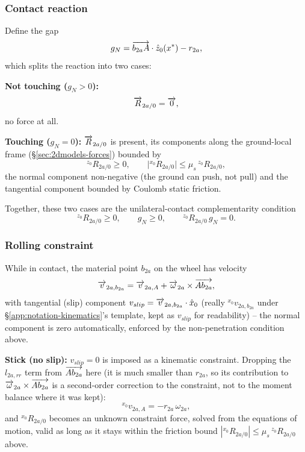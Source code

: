\subsubsection{Contact reaction}
Define the gap
\begin{equation}
    g_N = \overrightarrow{b_{2a}A}\cdot\hat z_0(x^*) - r_{2a},
\end{equation}
which splits the reaction into two cases:

\textbf{Not touching ($g_N>0$):}
\begin{equation}
    \overrightarrow{R}_{2a/0} = \overrightarrow{0},
\end{equation}
no force at all.

\textbf{Touching ($g_N=0$):} $\overrightarrow{R}_{2a/0}$ is present, its components along the ground-local frame (\S\ref{sec:2dmodels-forces}) bounded by
\begin{equation}
    {}^{z_0}R_{2a/0} \ge 0, \qquad \big|{}^{x_0}R_{2a/0}\big| \le \mu_s\,{}^{z_0}R_{2a/0},
\end{equation}
the normal component non-negative (the ground can push, not pull) and the tangential component bounded by Coulomb static friction.

Together, these two cases are the unilateral-contact complementarity condition
\begin{equation}
    {}^{z_0}R_{2a/0}\ge0, \qquad g_N\ge0, \qquad {}^{z_0}R_{2a/0}\,g_N=0.
\end{equation}

\subsubsection{Rolling constraint}
While in contact, the material point $b_{2a}$ on the wheel has velocity
\begin{equation}
    \overrightarrow{v}_{2a,b_{2a}} = \overrightarrow{v}_{2a,A} + \overrightarrow{\omega}_{2a}\times\overrightarrow{Ab_{2a}},
\end{equation}
with tangential (slip) component $v_{slip} = \overrightarrow{v}_{2a,b_{2a}}\cdot\hat x_0$ (really ${}^{x_0}v_{2a,b_{2a}}$ under \S\ref{app:notation-kinematics}'s template, kept as $v_{slip}$ for readability) -- the normal component is zero automatically, enforced by the non-penetration condition above.

\textbf{Stick (no slip):} $v_{slip}=0$ is imposed as a kinematic constraint. Dropping the $l_{2a,rr}$ term from $\overrightarrow{Ab_{2a}}$ here (it is much smaller than $r_{2a}$, so its contribution to $\overrightarrow{\omega}_{2a}\times\overrightarrow{Ab_{2a}}$ is a second-order correction to the constraint, not to the moment balance where it was kept):
\begin{equation}
    {}^{x_0}v_{2a,A} = -r_{2a}\,\omega_{2a},
\end{equation}
and ${}^{x_0}R_{2a/0}$ becomes an unknown constraint force, solved from the equations of motion, valid as long as it stays within the friction bound $|{}^{x_0}R_{2a/0}|\le\mu_s\,{}^{z_0}R_{2a/0}$ above.

